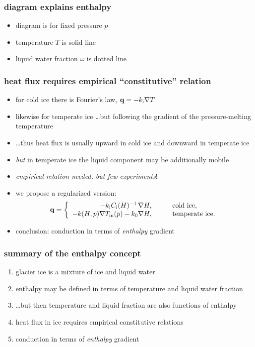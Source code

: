 \documentclass{beamer}
\begin{document}
\begin{frame}
  \frametitle{diagram explains enthalpy}

\begin{center}
    
\end{center}

\vspace{-0.2in}
\small
\begin{itemize}
\item diagram is for fixed pressure $p$
\item temperature $T$ is solid line
\item liquid water fraction $\omega$ is dotted line
\end{itemize}
\end{frame}


\begin{frame}
  \frametitle{heat flux requires empirical ``constitutive'' relation}
  
\begin{itemize}
\item for cold ice there is Fourier's law, $\mathbf{q} = - k_{\text i} \nabla T$
\item likewise for temperate ice \dots but following the gradient of the pressure-melting temperature
\item \dots thus heat flux is usually upward in cold ice and downward in temperate ice
\item \emph{but} in temperate ice the liquid component may be additionally mobile
\item \emph{empirical relation needed, but few experiments}!
\item we propose a regularized version:
\begin{equation*}
  {\mathbf q} = \left\{
    \begin{array}{rl}
      - k_{\text i} C_{\text i}(H)^{-1}\, \nabla H, & \qquad \text{cold ice},\\
      - k(H,p) \nabla T_{\text m}(p) - k_0 \nabla H, & \qquad \text{temperate ice}.
    \end{array} 
  \right.
\end{equation*}
\item conclusion: conduction in terms of \emph{enthalpy} gradient
\end{itemize}
\end{frame}



\begin{frame}
  \frametitle{summary of the enthalpy concept}

\begin{enumerate}
\item glacier ice is a mixture of ice and liquid water
\item enthalpy may be defined in terms of temperature and liquid water fraction
\item \dots but then temperature and liquid fraction are also functions of enthalpy
\item heat flux in ice requires empirical constitutive relations
\item conduction in terms of \emph{enthalpy} gradient
\end{enumerate}
\end{frame}
\end{document}
